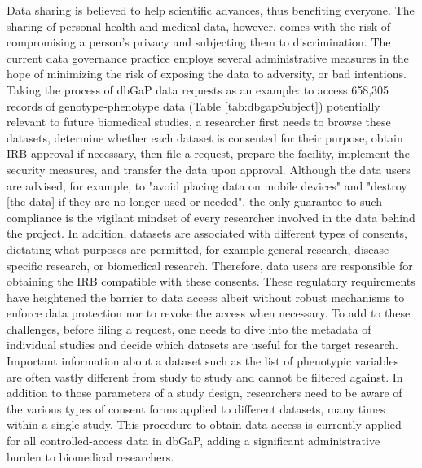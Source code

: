 \documentclass[letter]{bioinfo}
\begin{document}
	Data sharing is believed to help scientific advances, thus benefiting everyone. The sharing of personal health and medical data, however, comes with the risk of compromising a person's privacy and subjecting them to discrimination.  The current data governance practice employs several administrative measures in the hope of minimizing the risk of exposing the data to adversity, or bad intentions. Taking the process of dbGaP data requests as an example: to access 658,305 records of genotype-phenotype data (Table \ref{tab:dbgapSubject}) potentially relevant to future biomedical studies, a researcher first needs to browse these datasets, determine whether each dataset is consented for their purpose, obtain IRB approval if necessary, then file a request, prepare the facility, implement the security measures, and transfer the data upon approval. Although the data users are advised, for example, to "avoid placing data on mobile devices" and "destroy [the data] if they are no longer used or needed", the only guarantee to such compliance is the vigilant mindset of every researcher involved in the data behind the project.  In addition, datasets are associated with different types of consents, dictating what purposes are permitted, for example general research, disease-specific research, or biomedical research. Therefore, data users are responsible for obtaining the IRB compatible with these consents. These regulatory requirements have heightened the barrier to data access albeit without robust mechanisms to enforce data protection nor to revoke the access when necessary.  To add to these challenges, before filing a request, one needs to dive into the metadata of individual studies and decide which datasets are useful for the target research. Important information about a dataset such as the list of phenotypic variables are often vastly different from study to study and cannot be filtered against. In addition to those parameters of a study design, researchers need to be aware of the various types of consent forms applied to different datasets, many times within a single study. This procedure to obtain data access is currently applied for all controlled-access data in dbGaP, adding a significant administrative burden to biomedical researchers.
\end{document}
